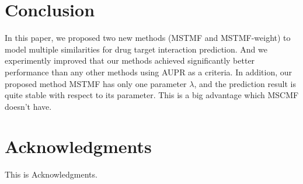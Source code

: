 \documentclass{article}
\begin{document}
\section{Conclusion}
In this paper, we proposed two new methods (MSTMF and MSTMF-weight) to model multiple similarities for drug target interaction prediction. And we experimently improved that our methods achieved significantly better performance than any other methods using AUPR as a criteria. In addition, our proposed method MSTMF has only one parameter $\lambda$, and the prediction result is quite stable with respect to its parameter. This is a big advantage which MSCMF doesn't have.    \\

\section{Acknowledgments}
This is Acknowledgments.



\end{document}
